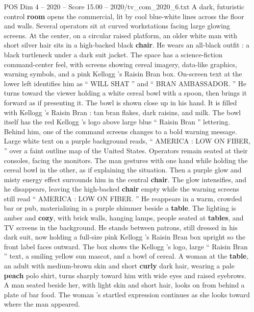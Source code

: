 \begin{textsample}{POS Dim 4 – 2020 – Score 15.00 – 2020/tv\_com\_2020\_6.txt}  \label{ex:f4_pos_017}
A dark, futuristic control \textbf{room} opens the commercial, lit by cool blue-white lines across the floor and walls.
Several operators sit at curved workstations facing large glowing screens.
At the center, on a circular raised platform, an older white man with short silver hair sits in a high-backed black \textbf{chair}.
He wears an all-black outfit : a black turtleneck under a dark suit jacket.
The space has a science-fiction command-center feel, with screens showing cereal imagery, data-like graphics, warning symbols, and a pink Kellogg ’s Raisin Bran box.
On-screen text at the lower left identifies him as “ WILL SHAT ” and “ BRAN AMBASSADOR. ” He turns toward the viewer holding a white cereal bowl with a spoon, then brings it forward as if presenting it.
The bowl is shown close up in his hand.
It is filled with Kellogg ’s Raisin Bran : tan bran flakes, dark raisins, and milk.
The bowl itself has the red Kellogg ’s logo above large blue “ Raisin Bran ” lettering.
Behind him, one of the command screens changes to a bold warning message.
Large white text on a purple background reads, “ AMERICA : LOW ON FIBER, ” over a faint outline map of the United States.
Operators remain seated at their consoles, facing the monitors.
The man gestures with one hand while holding the cereal bowl in the other, as if explaining the situation.
Then a purple glow and misty energy effect surrounds him in the central \textbf{chair}.
The glow intensifies, and he disappears, leaving the high-backed \textbf{chair} empty while the warning screens still read “ AMERICA : LOW ON FIBER. ” He reappears in a warm, crowded bar or pub, materializing in a purple shimmer beside a \textbf{table}.
The lighting is amber and \textbf{cozy}, with brick walls, hanging lamps, people seated at \textbf{tables}, and TV screens in the background.
He stands between patrons, still dressed in his dark suit, now holding a full-size pink Kellogg ’s Raisin Bran box upright so the front label faces outward.
The box shows the Kellogg ’s logo, large “ Raisin Bran ” text, a smiling yellow sun mascot, and a bowl of cereal.
A woman at the \textbf{table}, an adult with medium-brown skin and short \textbf{curly} dark hair, wearing a pale \textbf{peach} polo shirt, turns sharply toward him with wide eyes and raised eyebrows.
A man seated beside her, with light skin and short hair, looks on from behind a plate of bar food.
The woman ’s startled expression continues as she looks toward where the man appeared.

\end{textsample}
